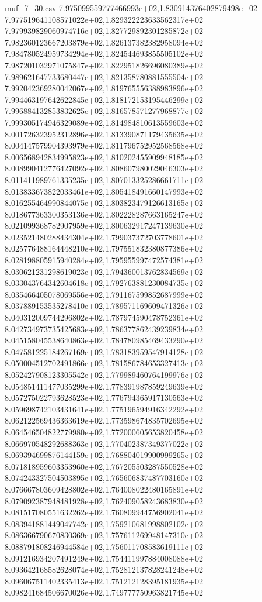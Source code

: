 \begin{filecontents*}{muf_7_30.csv}
7.975099559777466993e+02,1.830914376402879498e+02
7.977519641108571022e+02,1.829322223633562317e+02
7.979939829060974716e+02,1.827729892301285872e+02
7.982360123667203879e+02,1.826137382382958094e+02
7.984780524959734294e+02,1.824544693855505102e+02
7.987201032971075847e+02,1.822951826696080389e+02
7.989621647733680447e+02,1.821358780881555504e+02
7.992042369280042067e+02,1.819765556388983896e+02
7.994463197642622845e+02,1.818172153195446299e+02
7.996884132853832625e+02,1.816578571277968877e+02
7.999305174946329089e+02,1.814984810613559603e+02
8.001726323952312896e+02,1.813390871179435635e+02
8.004147579904393979e+02,1.811796752952568568e+02
8.006568942834995823e+02,1.810202455909948185e+02
8.008990412776427092e+02,1.808607980029046303e+02
8.011411989761335235e+02,1.807013325286661711e+02
8.013833673822033461e+02,1.805418491660147993e+02
8.016255464990844075e+02,1.803823479126613165e+02
8.018677363300353136e+02,1.802228287663165247e+02
8.021099368782907959e+02,1.800632917247139630e+02
8.023521480288434304e+02,1.799037372703778601e+02
8.025776488164448210e+02,1.797551832380877386e+02
8.028198805915940284e+02,1.795955997472574381e+02
8.030621231298619023e+02,1.794360013762834569e+02
8.033043764342604618e+02,1.792763881230084735e+02
8.035466405078069556e+02,1.791167599852687999e+02
8.037889153535278410e+02,1.789571169609471326e+02
8.040312009744296802e+02,1.787974590478752361e+02
8.042734973735425683e+02,1.786377862439239834e+02
8.045158045538640863e+02,1.784780985469433290e+02
8.047581225184267169e+02,1.783183959547914128e+02
8.050004512702491866e+02,1.781586784653327413e+02
8.052427908123305542e+02,1.779989460764199976e+02
8.054851411477035299e+02,1.778391987859249639e+02
8.057275022793628523e+02,1.776794365917130563e+02
8.059698742103431641e+02,1.775196594916342292e+02
8.062122569436363619e+02,1.773598674835702695e+02
8.064546504822779980e+02,1.772000605653820458e+02
8.066970548292688363e+02,1.770402387349377022e+02
8.069394699876144159e+02,1.768804019900999265e+02
8.071818959603353960e+02,1.767205503287550528e+02
8.074243327504503895e+02,1.765606837487703160e+02
8.076667803609428802e+02,1.764008022480165891e+02
8.079092387948481928e+02,1.762409058243683830e+02
8.081517080551632262e+02,1.760809944756902041e+02
8.083941881449047742e+02,1.759210681998802102e+02
8.086366790670830369e+02,1.757611269948147310e+02
8.088791808246944584e+02,1.756011708583619111e+02
8.091216934207491249e+02,1.754411997884008088e+02
8.093642168582628074e+02,1.752812137828241248e+02
8.096067511402335413e+02,1.751212128395181935e+02
8.098241684506670026e+02,1.749777750963821745e+02

\end{filecontents*}
